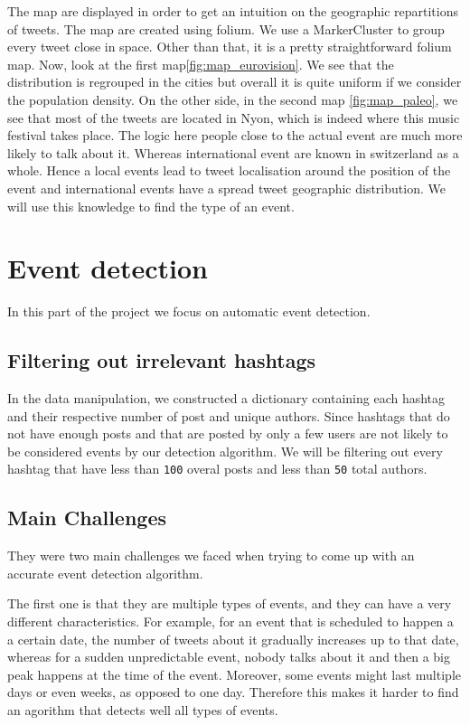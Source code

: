 \documentclass[11pt]{article}
\begin{document}
The map are displayed in order to get an intuition on the geographic repartitions of tweets. The map are created using folium. We use a MarkerCluster to group every tweet close in space. Other than that, it is a pretty straightforward folium map. Now, look at the first map\ref{fig:map_eurovision}. We see that the distribution is regrouped in the cities but overall it is quite uniform if we consider the population density. On the other side, in the second map \ref{fig:map_paleo}, we see that most of the tweets are located in Nyon, which is indeed where this music festival takes place. The logic here people close to the actual event are much more likely to talk about it. Whereas international event are known in switzerland as a whole. Hence a local events lead to tweet localisation around the position of the event and international events have a spread tweet geographic distribution. We will use this knowledge to find the type of an event.


\section{Event detection}

In this part of the project we focus on automatic event detection.

\subsection{Filtering out irrelevant hashtags}

In the data manipulation, we constructed a dictionary containing each hashtag and their respective number of post and unique authors.
Since hashtags that do not have enough posts and that are posted by only a few users are not likely to be considered events by our detection algorithm. We will be filtering out every hashtag that have less than \texttt{100} overal posts and less than \texttt{50} total authors. 

\subsection{Main Challenges}
They were two main challenges we faced when trying to come up with an accurate event detection algorithm. 

The first one is that they are multiple types of events, and they can have a very different characteristics. For example, for an event that is scheduled to happen a a certain date, the number of tweets about it gradually increases up to that date, whereas for a sudden unpredictable event, nobody talks about it and then a big peak happens at the time of the event. Moreover, some events might last multiple days or even weeks, as opposed to one day. Therefore this makes it harder to find an agorithm that detects well all types of events.
\end{document}
